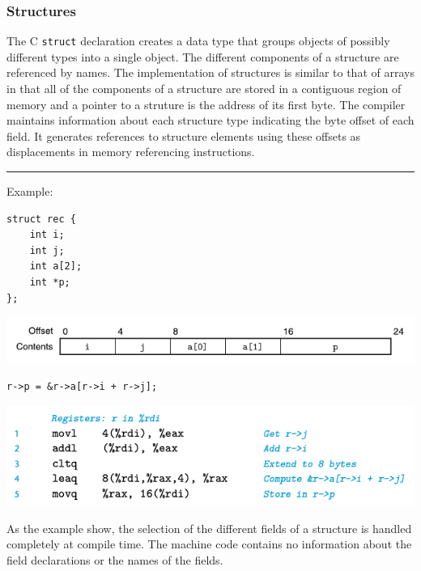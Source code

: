 \documentclass[11pt]{article}
\begin{document}
\subsubsection{Structures}
\label{sec:org1aaa59c}
The C \texttt{struct} declaration creates a data type that groups objects of possibly different types into a single object. The different components of a structure are referenced by names. The implementation of structures is similar to that of arrays in that all of the components of a structure are stored in a contiguous region of memory and a pointer to a struture is the address of its first byte. The compiler maintains information about each structure type indicating the byte offset of each field. It generates references to structure elements using these offsets as displacements in memory referencing instructions.\\


\noindent\rule{\textwidth}{0.5pt}
Example:\\
\begin{verbatim}
struct rec {
    int i;
    int j;
    int a[2];
    int *p;
};
\end{verbatim}

\begin{center}
\includegraphics[width=.9\linewidth]{pics/struct-offset.png}
\end{center}

\begin{verbatim}
r->p = &r->a[r->i + r->j];
\end{verbatim}

\begin{center}
\includegraphics[width=.9\linewidth]{pics/struct-offset-assembly-code.png}
\end{center}

As the example show, the selection of the different fields of a structure is handled completely at compile time. The machine code contains no information about the field declarations or the names of the fields.\\
\end{document}
